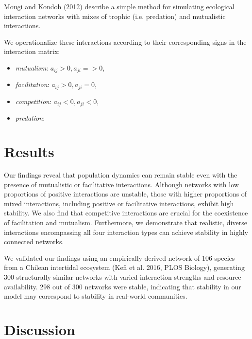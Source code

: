 \documentclass[]{article}
\begin{document}
Mougi and Kondoh (2012) describe a simple method for simulating ecological interaction networks with mixes of trophic (i.e. predation) and mutualistic interactions. 

We operationalize these interactions according to their corresponding signs in the interaction matrix:
\begin{itemize}
    \item \textit{mutualism}: $a_{ij} > 0, a_{ji} = > 0$,
    \item \textit{facilitation}: $a_{ij} > 0, a_{ji} = 0$,
    \item \textit{competition}: $a_{ij} < 0, a_{ji} < 0$,
    \item \textit{predation}:
\end{itemize}

\section{Results}



Our findings reveal that population dynamics can remain stable even with the presence of mutualistic or facilitative interactions. Although networks with low proportions of positive interactions are unstable, those with higher proportions of mixed interactions, including positive or facilitative interactions, exhibit high stability. We also find that competitive interactions are crucial for the coexistence of facilitation and mutualism. Furthermore, we demonstrate that realistic, diverse interactions encompassing all four interaction types can achieve stability in highly connected networks.

We validated our findings using an empirically derived network of 106 species from a Chilean intertidal ecosystem (Kefi et al. 2016, PLOS Biology), generating 300 structurally similar networks with varied interaction strengths and resource availability. 298 out of 300 networks were stable, indicating that stability in our model may correspond to stability in real-world communities.

\section{Discussion}
\end{document}
